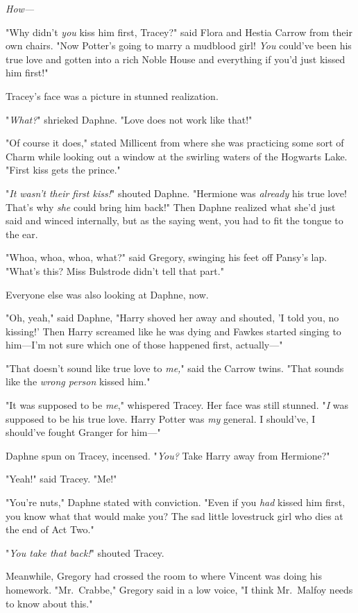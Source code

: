 \emph{How---}

"Why didn't \emph{you} kiss him first, Tracey?" said Flora and Hestia Carrow 
from their own chairs. "Now Potter's going to marry a mudblood girl! \emph{You} 
could've been his true love and gotten into a rich Noble House and everything 
if you'd just kissed him first!"

Tracey's face was a picture in stunned realization.

"\emph{What?}" shrieked Daphne. "Love does not work like that!"

"Of course it does," stated Millicent from where she was practicing some sort 
of Charm while looking out a window at the swirling waters of the Hogwarts 
Lake. "First kiss gets the prince."

"\emph{It wasn't their first kiss!}" shouted Daphne. "Hermione was 
\emph{already} his true love! That's why \emph{she} could bring him back!" Then 
Daphne realized what she'd just said and winced internally, but as the saying 
went, you had to fit the tongue to the ear.

"Whoa, whoa, whoa, what?" said Gregory, swinging his feet off Pansy's lap. 
"What's this? Miss Bulstrode didn't tell that part."

Everyone else was also looking at Daphne, now.

"Oh, yeah," said Daphne, "Harry shoved her away and shouted, 'I told you, no 
kissing!' Then Harry screamed like he was dying and Fawkes started singing to 
him---I'm not sure which one of those happened first, actually---"

"That doesn't sound like true love to \emph{me,}" said the Carrow twins. "That 
sounds like the \emph{wrong person} kissed him."

"It was supposed to be \emph{me}," whispered Tracey. Her face was still 
stunned. "\emph{I} was supposed to be his true love. Harry Potter was \emph{my} 
general. I should've, I should've fought Granger for him---"

Daphne spun on Tracey, incensed. "\emph{You?} Take Harry away from Hermione?"

"Yeah!" said Tracey. "Me!"

"You're nuts," Daphne stated with conviction. "Even if you \emph{had} kissed 
him first, you know what that would make you? The sad little lovestruck girl 
who dies at the end of Act Two."

"\emph{You take that back!}" shouted Tracey.

Meanwhile, Gregory had crossed the room to where Vincent was doing his 
homework. "Mr.~Crabbe," Gregory said in a low voice, "I think Mr.~Malfoy needs 
to know about this."
\sbreak
